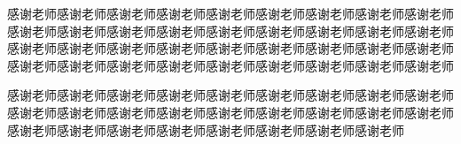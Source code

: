 \documentclass[supercite]{HustGraduPaper}
\begin{document}
	
	\begin{thankpage}
		感谢老师感谢老师感谢老师感谢老师感谢老师感谢老师感谢老师感谢老师感谢老师感谢老师感谢老师感谢老师感谢老师感谢老师感谢老师感谢老师感谢老师感谢老师感谢老师感谢老师感谢老师感谢老师感谢老师感谢老师感谢老师感谢老师感谢老师感谢老师感谢老师感谢老师感谢老师感谢老师感谢老师感谢老师感谢老师感谢老师
		
		感谢老师感谢老师感谢老师感谢老师感谢老师感谢老师感谢老师感谢老师感谢老师感谢老师感谢老师感谢老师感谢老师感谢老师感谢老师感谢老师感谢老师感谢老师感谢老师感谢老师感谢老师感谢老师感谢老师感谢老师感谢老师感谢老师
	\end{thankpage}
	
	
\end{document}
